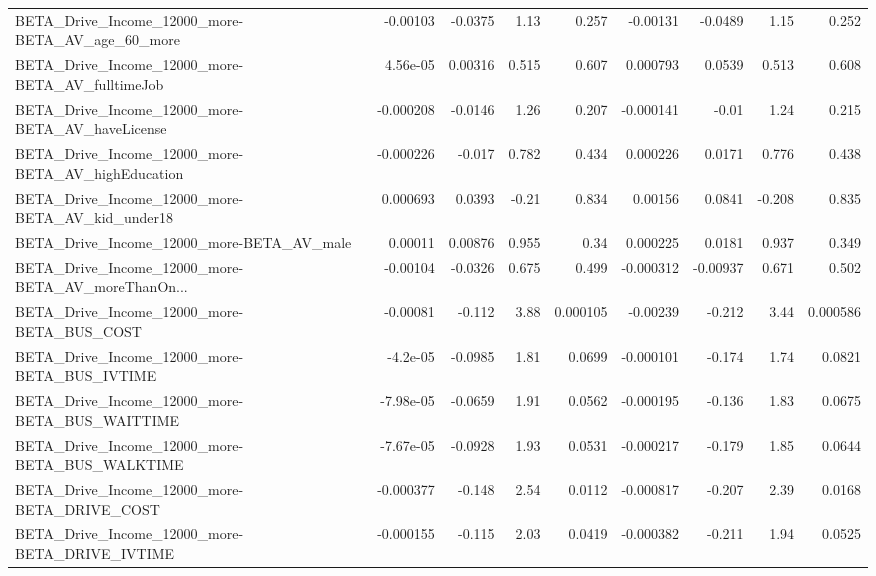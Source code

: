 \begin{tabular}{lrrrrrrrr}
BETA\_Drive\_Income\_12000\_more-BETA\_AV\_age\_60\_more   &    -0.00103 &      -0.0375 &     1.13 &    0.257 &   -0.00131 &     -0.0489 &         1.15 &         0.252 \\
BETA\_Drive\_Income\_12000\_more-BETA\_AV\_fulltimeJob   &    4.56e-05 &      0.00316 &    0.515 &    0.607 &   0.000793 &      0.0539 &        0.513 &         0.608 \\
BETA\_Drive\_Income\_12000\_more-BETA\_AV\_haveLicense   &   -0.000208 &      -0.0146 &     1.26 &    0.207 &  -0.000141 &       -0.01 &         1.24 &         0.215 \\
BETA\_Drive\_Income\_12000\_more-BETA\_AV\_highEducation &   -0.000226 &       -0.017 &    0.782 &    0.434 &   0.000226 &      0.0171 &        0.776 &         0.438 \\
BETA\_Drive\_Income\_12000\_more-BETA\_AV\_kid\_under18   &    0.000693 &       0.0393 &    -0.21 &    0.834 &    0.00156 &      0.0841 &       -0.208 &         0.835 \\
BETA\_Drive\_Income\_12000\_more-BETA\_AV\_male          &     0.00011 &      0.00876 &    0.955 &     0.34 &   0.000225 &      0.0181 &        0.937 &         0.349 \\
BETA\_Drive\_Income\_12000\_more-BETA\_AV\_moreThanOn... &    -0.00104 &      -0.0326 &    0.675 &    0.499 &  -0.000312 &    -0.00937 &        0.671 &         0.502 \\
BETA\_Drive\_Income\_12000\_more-BETA\_BUS\_COST         &    -0.00081 &       -0.112 &     3.88 & 0.000105 &   -0.00239 &      -0.212 &         3.44 &      0.000586 \\
BETA\_Drive\_Income\_12000\_more-BETA\_BUS\_IVTIME       &    -4.2e-05 &      -0.0985 &     1.81 &   0.0699 &  -0.000101 &      -0.174 &         1.74 &        0.0821 \\
BETA\_Drive\_Income\_12000\_more-BETA\_BUS\_WAITTIME     &   -7.98e-05 &      -0.0659 &     1.91 &   0.0562 &  -0.000195 &      -0.136 &         1.83 &        0.0675 \\
BETA\_Drive\_Income\_12000\_more-BETA\_BUS\_WALKTIME     &   -7.67e-05 &      -0.0928 &     1.93 &   0.0531 &  -0.000217 &      -0.179 &         1.85 &        0.0644 \\
BETA\_Drive\_Income\_12000\_more-BETA\_DRIVE\_COST       &   -0.000377 &       -0.148 &     2.54 &   0.0112 &  -0.000817 &      -0.207 &         2.39 &        0.0168 \\
BETA\_Drive\_Income\_12000\_more-BETA\_DRIVE\_IVTIME     &   -0.000155 &       -0.115 &     2.03 &   0.0419 &  -0.000382 &      -0.211 &         1.94 &        0.0525 \\

\end{tabular}
